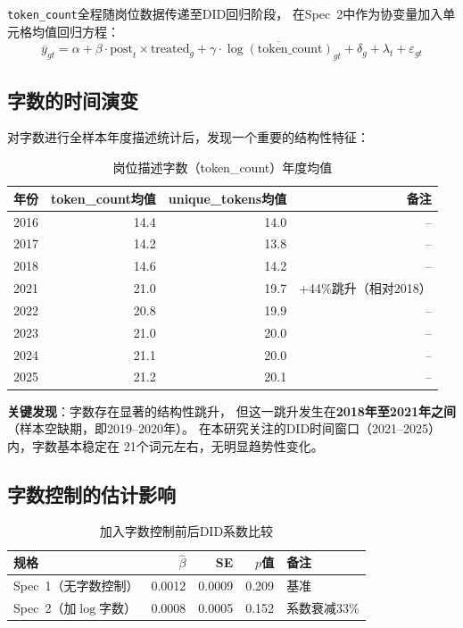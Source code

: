 \documentclass[12pt,a4paper]{ctexart}
\begin{document}
\texttt{token\_count}全程随岗位数据传递至DID回归阶段，
在Spec~2中作为协变量加入单元格均值回归方程：
\[
\overline{y}_{gt} = \alpha + \beta \cdot \text{post}_t \times \text{treated}_g
+ \gamma \cdot \overline{\log(\text{token\_count})}_{gt}
+ \delta_g + \lambda_t + \varepsilon_{gt}
\]

\subsection{字数的时间演变}

对字数进行全样本年度描述统计后，发现一个重要的结构性特征：

\begin{table}[h!]
\centering
\caption{岗位描述字数（token\_count）年度均值}
\label{tab:token_trend}
\begin{tabular}{lrrr}
\toprule
年份 & token\_count均值 & unique\_tokens均值 & 备注 \\
\midrule
2016 & 14.4 & 14.0 & -- \\
2017 & 14.2 & 13.8 & -- \\
2018 & 14.6 & 14.2 & -- \\
\midrule
2021 & 21.0 & 19.7 & +44\%跳升（相对2018） \\
2022 & 20.8 & 19.9 & -- \\
2023 & 21.0 & 20.0 & -- \\
2024 & 21.1 & 20.0 & -- \\
2025 & 21.2 & 20.1 & -- \\
\bottomrule
\end{tabular}
\end{table}

\textbf{关键发现}：字数存在显著的结构性跳升，
但这一跳升发生在\textbf{2018年至2021年之间}（样本空缺期，即2019--2020年）。
在本研究关注的DID时间窗口（2021--2025）内，字数基本稳定在
21个词元左右，无明显趋势性变化。

\subsection{字数控制的估计影响}

\begin{table}[h!]
\centering
\caption{加入字数控制前后DID系数比较}
\label{tab:token_did}
\begin{tabular}{lrrrl}
\toprule
规格 & $\hat{\beta}$ & SE & $p$值 & 备注 \\
\midrule
Spec~1（无字数控制） & 0.0012 & 0.0009 & 0.209 & 基准 \\
Spec~2（加$\log$字数） & 0.0008 & 0.0005 & 0.152 & 系数衰减33\% \\
\bottomrule
\end{tabular}
\end{table}
\end{document}
